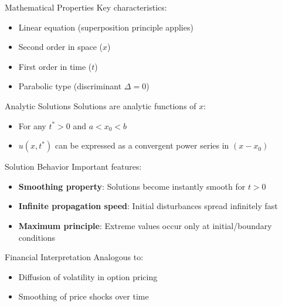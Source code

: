 \documentclass{beamer}
\begin{document}
\begin{frame}{Mathematical Properties}
    Key characteristics:
    \begin{itemize}
        \item Linear equation (superposition principle applies)
        \item Second order in space ($x$)
        \item First order in time ($t$)
        \item Parabolic type (discriminant $\Delta = 0$)
    \end{itemize}
    
    \begin{block}{Analytic Solutions}
        Solutions are analytic functions of $x$:
        \begin{itemize}
            \item For any $t^* > 0$ and $a < x_0 < b$
            \item $u(x,t^*)$ can be expressed as a convergent power series in $(x-x_0)$
        \end{itemize}
    \end{block}
\end{frame}

\begin{frame}{Solution Behavior}
    Important features:
    \begin{itemize}
        \item \textbf{Smoothing property}: Solutions become instantly smooth for $t>0$
        \item \textbf{Infinite propagation speed}: Initial disturbances spread infinitely fast
        \item \textbf{Maximum principle}: Extreme values occur only at initial/boundary conditions
    \end{itemize}
    
    \begin{alertblock}{Financial Interpretation}
        Analogous to:
        \begin{itemize}
            \item Diffusion of volatility in option pricing
            \item Smoothing of price shocks over time
        \end{itemize}
    \end{alertblock}
\end{frame}
\end{document}
